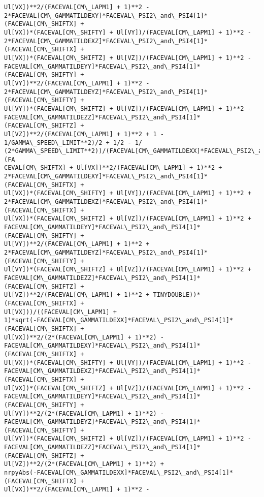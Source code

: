 \documentclass[landscape,letterpaper,10pt,english]{article}
\begin{document}
\begin{Verbatim}[commandchars=\\\{\}]
Ul[VX])**2/(FACEVAL[CM\_LAPM1] + 1)**2 -
2*FACEVAL[CM\_GAMMATILDEXY]*FACEVAL\_PSI2\_and\_PSI4[1]*(FACEVAL[CM\_SHIFTX] +
Ul[VX])*(FACEVAL[CM\_SHIFTY] + Ul[VY])/(FACEVAL[CM\_LAPM1] + 1)**2 -
2*FACEVAL[CM\_GAMMATILDEXZ]*FACEVAL\_PSI2\_and\_PSI4[1]*(FACEVAL[CM\_SHIFTX] +
Ul[VX])*(FACEVAL[CM\_SHIFTZ] + Ul[VZ])/(FACEVAL[CM\_LAPM1] + 1)**2 -
FACEVAL[CM\_GAMMATILDEYY]*FACEVAL\_PSI2\_and\_PSI4[1]*(FACEVAL[CM\_SHIFTY] +
Ul[VY])**2/(FACEVAL[CM\_LAPM1] + 1)**2 -
2*FACEVAL[CM\_GAMMATILDEYZ]*FACEVAL\_PSI2\_and\_PSI4[1]*(FACEVAL[CM\_SHIFTY] +
Ul[VY])*(FACEVAL[CM\_SHIFTZ] + Ul[VZ])/(FACEVAL[CM\_LAPM1] + 1)**2 -
FACEVAL[CM\_GAMMATILDEZZ]*FACEVAL\_PSI2\_and\_PSI4[1]*(FACEVAL[CM\_SHIFTZ] +
Ul[VZ])**2/(FACEVAL[CM\_LAPM1] + 1)**2 + 1 - 1/GAMMA\_SPEED\_LIMIT**2)/2 + 1/2 - 1/
(2*GAMMA\_SPEED\_LIMIT**2))/(FACEVAL[CM\_GAMMATILDEXX]*FACEVAL\_PSI2\_and\_PSI4[1]*(FA
CEVAL[CM\_SHIFTX] + Ul[VX])**2/(FACEVAL[CM\_LAPM1] + 1)**2 +
2*FACEVAL[CM\_GAMMATILDEXY]*FACEVAL\_PSI2\_and\_PSI4[1]*(FACEVAL[CM\_SHIFTX] +
Ul[VX])*(FACEVAL[CM\_SHIFTY] + Ul[VY])/(FACEVAL[CM\_LAPM1] + 1)**2 +
2*FACEVAL[CM\_GAMMATILDEXZ]*FACEVAL\_PSI2\_and\_PSI4[1]*(FACEVAL[CM\_SHIFTX] +
Ul[VX])*(FACEVAL[CM\_SHIFTZ] + Ul[VZ])/(FACEVAL[CM\_LAPM1] + 1)**2 +
FACEVAL[CM\_GAMMATILDEYY]*FACEVAL\_PSI2\_and\_PSI4[1]*(FACEVAL[CM\_SHIFTY] +
Ul[VY])**2/(FACEVAL[CM\_LAPM1] + 1)**2 +
2*FACEVAL[CM\_GAMMATILDEYZ]*FACEVAL\_PSI2\_and\_PSI4[1]*(FACEVAL[CM\_SHIFTY] +
Ul[VY])*(FACEVAL[CM\_SHIFTZ] + Ul[VZ])/(FACEVAL[CM\_LAPM1] + 1)**2 +
FACEVAL[CM\_GAMMATILDEZZ]*FACEVAL\_PSI2\_and\_PSI4[1]*(FACEVAL[CM\_SHIFTZ] +
Ul[VZ])**2/(FACEVAL[CM\_LAPM1] + 1)**2 + TINYDOUBLE))*(FACEVAL[CM\_SHIFTX] +
Ul[VX]))/((FACEVAL[CM\_LAPM1] +
1)*sqrt(-FACEVAL[CM\_GAMMATILDEXX]*FACEVAL\_PSI2\_and\_PSI4[1]*(FACEVAL[CM\_SHIFTX] +
Ul[VX])**2/(2*(FACEVAL[CM\_LAPM1] + 1)**2) -
FACEVAL[CM\_GAMMATILDEXY]*FACEVAL\_PSI2\_and\_PSI4[1]*(FACEVAL[CM\_SHIFTX] +
Ul[VX])*(FACEVAL[CM\_SHIFTY] + Ul[VY])/(FACEVAL[CM\_LAPM1] + 1)**2 -
FACEVAL[CM\_GAMMATILDEXZ]*FACEVAL\_PSI2\_and\_PSI4[1]*(FACEVAL[CM\_SHIFTX] +
Ul[VX])*(FACEVAL[CM\_SHIFTZ] + Ul[VZ])/(FACEVAL[CM\_LAPM1] + 1)**2 -
FACEVAL[CM\_GAMMATILDEYY]*FACEVAL\_PSI2\_and\_PSI4[1]*(FACEVAL[CM\_SHIFTY] +
Ul[VY])**2/(2*(FACEVAL[CM\_LAPM1] + 1)**2) -
FACEVAL[CM\_GAMMATILDEYZ]*FACEVAL\_PSI2\_and\_PSI4[1]*(FACEVAL[CM\_SHIFTY] +
Ul[VY])*(FACEVAL[CM\_SHIFTZ] + Ul[VZ])/(FACEVAL[CM\_LAPM1] + 1)**2 -
FACEVAL[CM\_GAMMATILDEZZ]*FACEVAL\_PSI2\_and\_PSI4[1]*(FACEVAL[CM\_SHIFTZ] +
Ul[VZ])**2/(2*(FACEVAL[CM\_LAPM1] + 1)**2) +
nrpyAbs(-FACEVAL[CM\_GAMMATILDEXX]*FACEVAL\_PSI2\_and\_PSI4[1]*(FACEVAL[CM\_SHIFTX] +
Ul[VX])**2/(FACEVAL[CM\_LAPM1] + 1)**2 -

\end{Verbatim}
\end{document}
